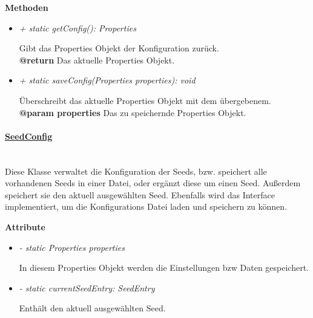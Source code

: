             \textbf{Methoden}					
            \begin{itemize}
                \item \textit{+ {static} getConfig(): Properties}
                    \begin{leftbar}[0.9\linewidth]
                        Gibt das Properties Objekt der Konfiguration zurück.\\
                        \textbf{@return} Das aktuelle Properties Objekt.
                    \end{leftbar}
                \item \textit{+ {static} saveConfig(Properties properties): void}
                    \begin{leftbar}[0.9\linewidth]
                        Überschreibt das aktuelle Properties Objekt mit dem übergebenem.\\
                        \textbf{@param properties} Das zu speichernde Properties Objekt.
                    \end{leftbar}
            \end{itemize}
            \pagebreak
        \paragraph{\underline{SeedConfig}} \mbox{}\\
            Diese Klasse verwaltet die Konfiguration der Seeds, bzw. speichert alle 
            vorhandenen Seeds in einer Datei, oder ergänzt diese um einen Seed. 
            Außerdem speichert sie den aktuell ausgewählten Seed.
            Ebenfalls wird das Interface~ implementiert, um die Konfigurations Datei
            laden und speichern zu können. \par 
            \textbf{Attribute}
            \begin{itemize}
                \item \textit{- {static} Properties properties}
                    \begin{leftbar}[0.9\linewidth]
                        In diesem Properties Objekt werden die Einstellungen bzw Daten 
                        gespeichert.
                    \end{leftbar}
                \item \textit{- {static} currentSeedEntry: SeedEntry} 
                    \begin{leftbar}[0.9\linewidth]
                        Enthält den aktuell ausgewählten Seed.
                    \end{leftbar}
            \end{itemize}
            
